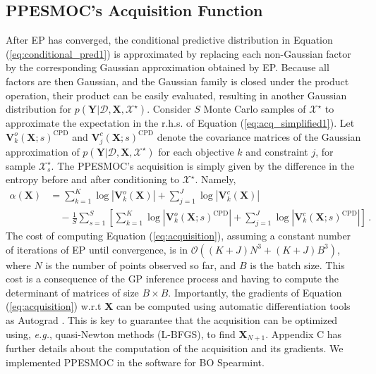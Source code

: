 \subsection{PPESMOC's Acquisition Function}
\label{sec:ppesmoc}
After EP has converged, the conditional predictive distribution in Equation (\ref{eq:conditional_pred1}) is approximated 
by replacing each non-Gaussian factor by the corresponding Gaussian approximation obtained by EP. Because all 
factors are then Gaussian, and the Gaussian family is closed under the product operation, their product can 
be easily evaluated, resulting in another Gaussian distribution for 
$p(\mathbf{Y}|\mathcal{D},\mathbf{X},\mathcal{X}^\star)$. 
Consider $S$ Monte Carlo samples of $\mathcal{X}^\star$ to approximate the expectation in the r.h.s. 
of Equation (\ref{eq:acq_simplified1}). Let $\mathbf{V}_k^o(\mathbf{X};s)^\text{CPD}$ and 
$\mathbf{V}_j^c(\mathbf{X};s)^\text{CPD}$ denote the covariance matrices of the Gaussian approximation of 
$p(\mathbf{Y}|\mathcal{D},\mathbf{X},\mathcal{X}^\star)$ for each objective $k$ and constraint $j$, for sample 
$\mathcal{X}^\star_s$. The PPESMOC's acquisition is simply given by the difference in the entropy 
before and after conditioning to $\mathcal{X}^\star$. Namely,
\begin{align}
\alpha(\mathbf{X}) &= \sum_{k=1}^K \log |\mathbf{V}_k^o(\mathbf{X})| + \sum_{j=1}^J \log |\mathbf{V}_k^c(\mathbf{X})| 
	\nonumber \\
	& \quad 
	- \frac{1}{S} \sum_{s=1}^S \left[  \sum_{k=1}^K \log |\mathbf{V}_k^o(\mathbf{X};s)^\text{CPD}| + 
	\sum_{j=1}^J \log |\mathbf{V}_k^c(\mathbf{X};s)^\text{CPD}|  \right]\,.
	\label{eq:acquisition}
\end{align}
The cost of computing Equation (\ref{eq:acquisition}), assuming a constant number of iterations of EP until convergence,
is in $\mathcal{O}((K+J)N^3+(K+J)B^3)$, where $N$ is the number of points observed so far, and $B$ is the batch size.
This cost is a consequence of the GP inference process and having to compute the determinant of matrices of size $B \times B$.
Importantly, the gradients of Equation (\ref{eq:acquisition}) w.r.t $\mathbf{X}$ can be computed using automatic differentiation tools as Autograd \citep{maclaurin2015autograd}.
This is key to guarantee that the acquisition can be optimized using, \emph{e.g.}, quasi-Newton methods (L-BFGS), 
to find $\mathbf{X}_{N+1}$. Appendix C has further details about the computation of the acquisition and its gradients. We implemented PPESMOC in the software for 
BO Spearmint. 

